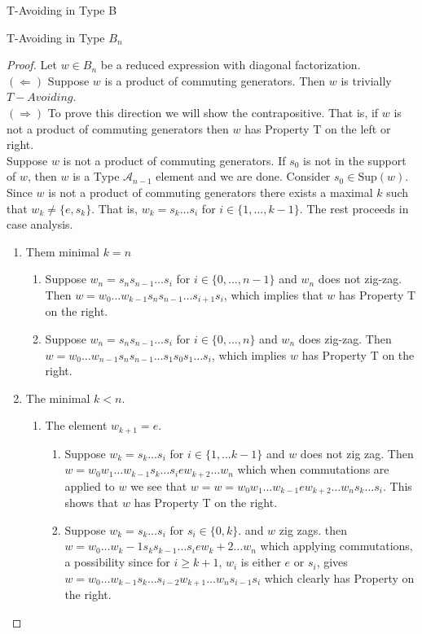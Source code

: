 \documentclass[11pt]{amsart}
\theoremstyle{definition}
\numberwithin{equation}{section}
\newcommand{\A}{\mathcal{A}}
\renewcommand{\(}{\left(}
\renewcommand{\)}{\right)}
\newcommand{\Sup}{\textrm{Sup}}
\begin{document}
\begin{section}{T-Avoiding in Type B}
\begin{subsection}{T-Avoiding in Type $B_n$}
\begin{proof}
	Let $w \in B_n$ be a reduced expression with diagonal factorization.\\
	$(\Leftarrow)$ Suppose $w$ is a product of commuting generators. Then $w$ is trivially $T-Avoiding$.\\
	$(\Rightarrow)$ To prove this direction we will show the contrapositive. That is, if $w$ is not a product of commuting generators then $w$ has Property T on the left or right.\\
	Suppose $w$ is not a product of commuting generators. If $s_0$ is not in the support of $w$, then $w$ is a Type $\A_{n-1}$ element and we are done. Consider $s_0 \in \Sup(w)$. Since $w$ is not a product of commuting generators there exists a maximal $k$ such that $w_k \neq \{e, s_k\}$. That is, $w_k=s_k \ldots s_i$ for $i \in \{1, \ldots ,k-1\}$. The rest proceeds in case analysis.
	\begin{enumerate}
	\item Them minimal $k=n$
	\begin{enumerate}
	\item Suppose $w_n=s_ns_{n-1} \ldots s_i$ for $i \in \{0, \ldots ,n-1\}$ and $w_n$ does not zig-zag. Then $w=w_0 \ldots w_{k-1} s_n s_{n-1} \ldots s_{i+1} s_i$, which implies that $w$ has Property T on the right.
	\item Suppose $w_n=s_n s_{n-1} \ldots s_i$ for $i \in \{0, \ldots ,n\}$ and $w_n$ does zig-zag. Then $w=w_0 \ldots w_{n-1} s_n s_{n-1} \ldots s_1 s_0 s_1 \ldots s_i$, which implies $w$ has Property T on the right.
	\end{enumerate}
	\item The minimal $k < n$.
	\begin{enumerate}
	\item The element $w_{k+1}=e$.
	\begin{enumerate}
	\item Suppose $w_k =s_k \ldots s_i$ for $i \in \{1, \ldots k-1\}$ and $w$ does not zig zag. Then $w=w_0 w_1 \ldots w_{k-1} s_k \ldots s_i e w_{k+2} \ldots w_n$ which when commutations are applied to $w$ we see that $w=w=w_0 w_1 \ldots w_{k-1} e w_{k+2} \ldots w_n s_k \ldots s_i$. This shows that $w$ has Property T on the right.
	\item Suppose $w_k=s_k \ldots s_i$ for $s_i \in \{0, k\}$. and $w$ zig zags. then $w=w_0 \ldots w_k-1 s_k s_{k-1} \ldots s_i e w_k+2 \ldots w_n$ which applying commutations, a possibility since for $i \geq k+1$, $w_i$ is either $e$ or $s_i$, gives $w=w_0 \ldots w_{k-1} s_k \ldots s_{i-2} w_{k+1} \ldots w_n s_{i-1} s_i$ which clearly has Property on the right.

\end{enumerate}
\end{enumerate}
\end{enumerate}
\end{proof}
\end{subsection}
\end{section}
\end{document}
